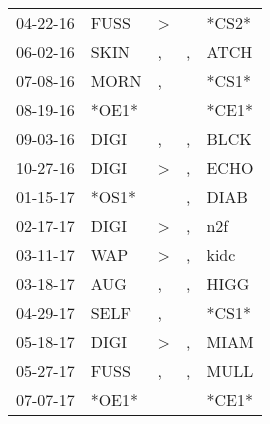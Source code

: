 \begin{supertabular}{p{0.07\textwidth}p{0.06\textwidth}p{0.02\textwidth}p{0.02\textwidth}p{0.06\textwidth}}
          04-22-16\textsuperscript{} &           FUSS\textsuperscript{} &     \textgreater &                  &                            *CS2* \\
          06-02-16\textsuperscript{} &           SKIN\textsuperscript{} &                , &                , &           ATCH\textsuperscript{} \\
          07-08-16\textsuperscript{} &           MORN\textsuperscript{} &                , &                  &                            *CS1* \\
          08-19-16\textsuperscript{} &                            *OE1* &                  &                  &                            *CE1* \\
          09-03-16\textsuperscript{} &           DIGI\textsuperscript{} &                , &                , &           BLCK\textsuperscript{} \\
          10-27-16\textsuperscript{} &           DIGI\textsuperscript{} &     \textgreater &                , &           ECHO\textsuperscript{} \\
          01-15-17\textsuperscript{} &                            *OS1* &                  &                , &           DIAB\textsuperscript{} \\
          02-17-17\textsuperscript{} &           DIGI\textsuperscript{} &     \textgreater &                , &            n2f\textsuperscript{} \\
          03-11-17\textsuperscript{} &            WAP\textsuperscript{} &     \textgreater &                , &           kidc\textsuperscript{} \\
          03-18-17\textsuperscript{} &            AUG\textsuperscript{} &                , &                , &           HIGG\textsuperscript{} \\
          04-29-17\textsuperscript{} &           SELF\textsuperscript{} &                , &                  &                            *CS1* \\
          05-18-17\textsuperscript{} &           DIGI\textsuperscript{} &     \textgreater &                , &           MIAM\textsuperscript{} \\
          05-27-17\textsuperscript{} &           FUSS\textsuperscript{} &                , &                , &           MULL\textsuperscript{} \\
          07-07-17\textsuperscript{} &                            *OE1* &                  &                  &                            *CE1* \\

\end{supertabular}
